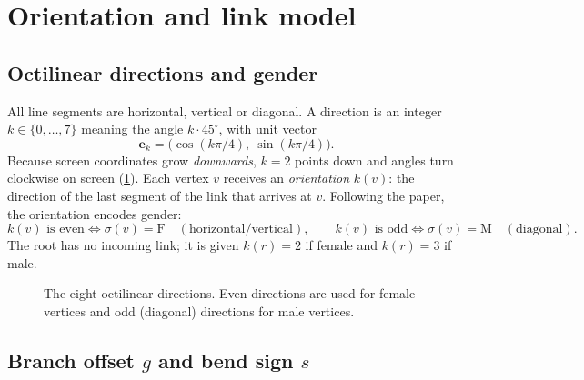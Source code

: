 \documentclass[11pt,a4paper]{article}
\newcommand{\dirv}[1]{\mathbf{e}_{#1}}
\begin{document}
\section{Orientation and link model}
\label{sec:links}

\subsection{Octilinear directions and gender}

All line segments are horizontal, vertical or diagonal. A direction is an integer $k\in\{0,\dots,7\}$ meaning the angle $k\cdot 45^\circ$, with unit vector
\[
  \dirv{k} = \bigl(\cos(k\pi/4),\ \sin(k\pi/4)\bigr).
\]
Because screen coordinates grow \emph{downwards}, $k=2$ points down and angles turn clockwise on screen (\cref{fig:compass}). Each vertex $v$ receives an \emph{orientation} $k(v)$: the direction of the last segment of the link that arrives at $v$. Following the paper, the orientation encodes gender:
\[
  k(v) \text{ is even} \iff \sigma(v)=\mathrm F \quad(\text{horizontal/vertical}),\qquad
  k(v) \text{ is odd} \iff \sigma(v)=\mathrm M \quad(\text{diagonal}).
\]
The root has no incoming link; it is given $k(r)=2$ if female and $k(r)=3$ if male.

\begin{figure}[ht]
\centering
{}
\caption{The eight octilinear directions. Even directions are used for female vertices and odd (diagonal) directions for male vertices.}
\label{fig:compass}
\end{figure}

\subsection{Branch offset $g$ and bend sign $s$}
\end{document}
